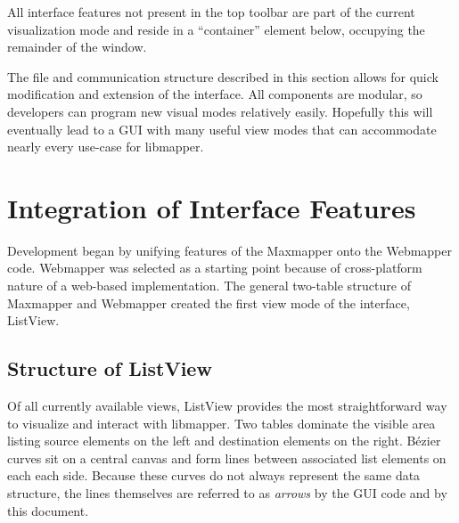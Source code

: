 All interface features not present in the top toolbar are part of the current visualization mode and reside in a ``container'' element below, occupying the remainder of the window.


The file and communication structure described in this section allows for quick modification and extension of the interface. All components are modular, so developers can program new visual modes relatively easily. Hopefully this will eventually lead to a GUI with many useful view modes that can accommodate nearly every use-case for libmapper.


\section{Integration of Interface Features} %
\label{sec:integration_of_interface_features}

Development began by unifying features of the Maxmapper onto the Webmapper code. Webmapper was selected as a starting point because of cross-platform nature of a web-based implementation. The general two-table structure of Maxmapper and Webmapper created the first view mode of the interface, ListView.

	\subsection{Structure of ListView} %
	\label{sub:ListView}

Of all currently available views, ListView provides the most straightforward way to visualize and interact with libmapper. Two tables dominate the visible area listing source elements on the left and destination elements on the right. B\'ezier curves sit on a central canvas and form lines between associated list elements on each each side. Because these curves do not always represent the same data structure, the lines themselves are referred to as \emph{arrows} by the GUI code and by this document.

